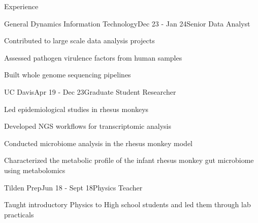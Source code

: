 \documentclass{resume} %
\begin{document}
\begin{rSection}{Experience}
\begin{rSubsection}{General Dynamics Information Technology}{Dec 23 - Jan 24}{Senior Data Analyst}{}

\item Contributed to large scale data analysis projects
\item Assessed pathogen virulence factors from human samples
\item Built whole genome sequencing pipelines

\end{rSubsection}


\begin{rSubsection}{UC Davis}{Apr 19 - Dec 23}{Graduate Student Researcher}{}

\item Led epidemiological studies in rhesus monkeys
\item Developed NGS workflows for transcriptomic analysis
\item Conducted microbiome analysis in the rhesus monkey model
\item Characterized the metabolic profile of the infant rhesus monkey gut microbiome using metabolomics

\end{rSubsection}


\begin{rSubsection}{Tilden Prep}{Jun 18 - Sept 18}{Physics Teacher}{}

\item Taught introductory Physics to High school students and led them through lab practicals

\end{rSubsection}
\end{rSection}


%
%
\end{document}
